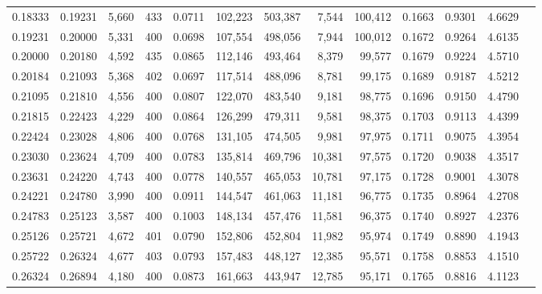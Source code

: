 \begin{tabular}{rrrrrrrrrrrrr}
0.18333 & 0.19231 &  5,660 &   433 &                                     0.0711 & 102,223 & 503,387 &   7,544 & 100,412 & 0.1663 & 0.9301 & 4.6629 \\
0.19231 & 0.20000 &  5,331 &   400 &                                     0.0698 & 107,554 & 498,056 &   7,944 & 100,012 & 0.1672 & 0.9264 & 4.6135 \\
0.20000 & 0.20180 &  4,592 &   435 &                                     0.0865 & 112,146 & 493,464 &   8,379 &  99,577 & 0.1679 & 0.9224 & 4.5710 \\
0.20184 & 0.21093 &  5,368 &   402 &                                     0.0697 & 117,514 & 488,096 &   8,781 &  99,175 & 0.1689 & 0.9187 & 4.5212 \\
0.21095 & 0.21810 &  4,556 &   400 &                                     0.0807 & 122,070 & 483,540 &   9,181 &  98,775 & 0.1696 & 0.9150 & 4.4790 \\
0.21815 & 0.22423 &  4,229 &   400 &                                     0.0864 & 126,299 & 479,311 &   9,581 &  98,375 & 0.1703 & 0.9113 & 4.4399 \\
0.22424 & 0.23028 &  4,806 &   400 &                                     0.0768 & 131,105 & 474,505 &   9,981 &  97,975 & 0.1711 & 0.9075 & 4.3954 \\
0.23030 & 0.23624 &  4,709 &   400 &                                     0.0783 & 135,814 & 469,796 &  10,381 &  97,575 & 0.1720 & 0.9038 & 4.3517 \\
0.23631 & 0.24220 &  4,743 &   400 &                                     0.0778 & 140,557 & 465,053 &  10,781 &  97,175 & 0.1728 & 0.9001 & 4.3078 \\
0.24221 & 0.24780 &  3,990 &   400 &                                     0.0911 & 144,547 & 461,063 &  11,181 &  96,775 & 0.1735 & 0.8964 & 4.2708 \\
0.24783 & 0.25123 &  3,587 &   400 &                                     0.1003 & 148,134 & 457,476 &  11,581 &  96,375 & 0.1740 & 0.8927 & 4.2376 \\
0.25126 & 0.25721 &  4,672 &   401 &                                     0.0790 & 152,806 & 452,804 &  11,982 &  95,974 & 0.1749 & 0.8890 & 4.1943 \\
0.25722 & 0.26324 &  4,677 &   403 &                                     0.0793 & 157,483 & 448,127 &  12,385 &  95,571 & 0.1758 & 0.8853 & 4.1510 \\
0.26324 & 0.26894 &  4,180 &   400 &                                     0.0873 & 161,663 & 443,947 &  12,785 &  95,171 & 0.1765 & 0.8816 & 4.1123 \\

\end{tabular}
